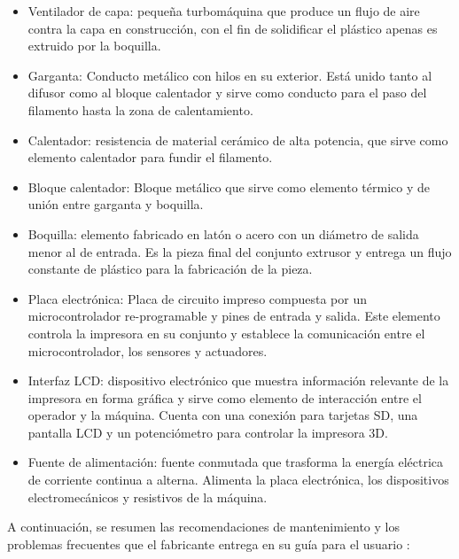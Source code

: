\begin{itemize}
\item Ventilador de capa: pequeña turbomáquina que produce un flujo de aire contra la capa en construcción, con el fin de solidificar el plástico apenas es extruido por la boquilla.
\item Garganta: Conducto metálico con hilos en su exterior. Está unido tanto al difusor como al bloque calentador y sirve como conducto para el paso del filamento hasta la zona de calentamiento.
\item Calentador: resistencia de material cerámico de alta potencia, que sirve como elemento calentador para fundir el filamento.
\item Bloque calentador: Bloque metálico que sirve como elemento térmico y de unión entre garganta y boquilla.
\item Boquilla: elemento fabricado en latón o acero con un diámetro de salida menor al de entrada. Es la pieza final del conjunto extrusor y entrega un flujo constante de plástico para la fabricación de la pieza.
\item Placa electrónica: Placa de circuito impreso compuesta por un microcontrolador re-programable y pines de entrada y salida. Este elemento controla la impresora en su conjunto y establece la comunicación entre el microcontrolador, los sensores y actuadores.
\item Interfaz LCD: dispositivo electrónico que muestra información relevante de la impresora en forma gráfica y sirve como elemento de interacción entre el operador y la máquina. Cuenta con una conexión para tarjetas SD, una pantalla LCD y un potenciómetro para controlar la impresora 3D. 
\item Fuente de alimentación: fuente conmutada que trasforma la energía eléctrica de corriente continua a alterna. Alimenta la placa electrónica, los dispositivos electromecánicos y resistivos de la máquina. 
\end{itemize}

A continuación, se resumen las recomendaciones de mantenimiento y los problemas frecuentes que el fabricante entrega en su guía para el usuario \citep{germanreprap2019}:

